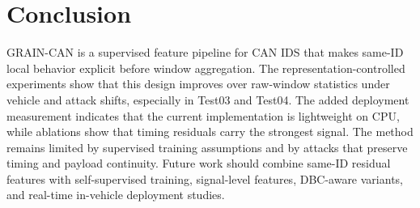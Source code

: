 \documentclass[runningheads]{llncs}
\newcommand{\method}{GRAIN-CAN}
\begin{document}
\section{Conclusion}
\method{} is a supervised feature pipeline for CAN IDS that makes same-ID local behavior explicit before window aggregation. The representation-controlled experiments show that this design improves over raw-window statistics under vehicle and attack shifts, especially in Test03 and Test04. The added deployment measurement indicates that the current implementation is lightweight on CPU, while ablations show that timing residuals carry the strongest signal. The method remains limited by supervised training assumptions and by attacks that preserve timing and payload continuity. Future work should combine same-ID residual features with self-supervised training, signal-level features, DBC-aware variants, and real-time in-vehicle deployment studies.
\end{document}
